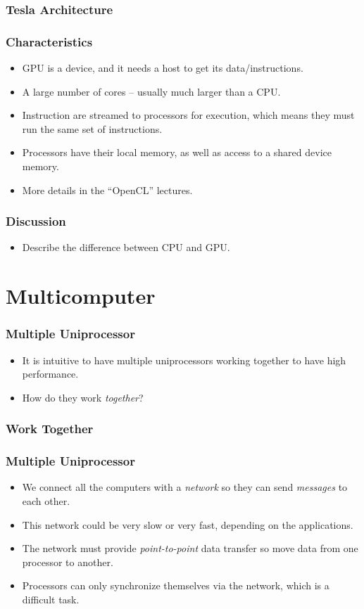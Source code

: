 \documentclass{beamer}
\begin{document}
\begin{CJK}{UTF8}{bsmi}
\begin{frame}
\frametitle{Tesla Architecture}
\centerline{}
\end{frame}

\begin{frame}
\frametitle{Characteristics}
\begin{itemize}
\item GPU is a device, and it needs a host to get its
  data/instructions.
\item A large number of cores -- usually much larger than a CPU.
\item Instruction are streamed to processors for execution, which
  means they must run the same set of instructions.
\item Processors have their local memory, as well as access to a
  shared device memory.
\item More details in the ``OpenCL'' lectures.
\end{itemize}
\end{frame}


\begin{frame}
\frametitle{Discussion}
\begin{itemize}
\item Describe the difference between CPU and GPU.
\end{itemize}
\end{frame}


\section{Multicomputer}

\begin{frame}
\frametitle{Multiple Uniprocessor}
\begin{itemize}
\item It is intuitive to have multiple uniprocessors working together
  to have high performance.
\item How do they work {\em together}?
\end{itemize}
\end{frame}


\begin{frame}
\frametitle{Work Together}
\centerline{}
\end{frame}


\begin{frame}
\frametitle{Multiple Uniprocessor}
\begin{itemize}
\item We connect all the computers with a {\em network} so they can
  send {\em messages} to each other.
\item This network could be very slow or very fast, depending on the
  applications.
\item The network must provide {\em point-to-point} data transfer so
  move data from one processor to another.
\item Processors can only synchronize themselves via the network, which
  is a difficult task.
\end{itemize}
\end{frame}


\end{CJK}
\end{document}
